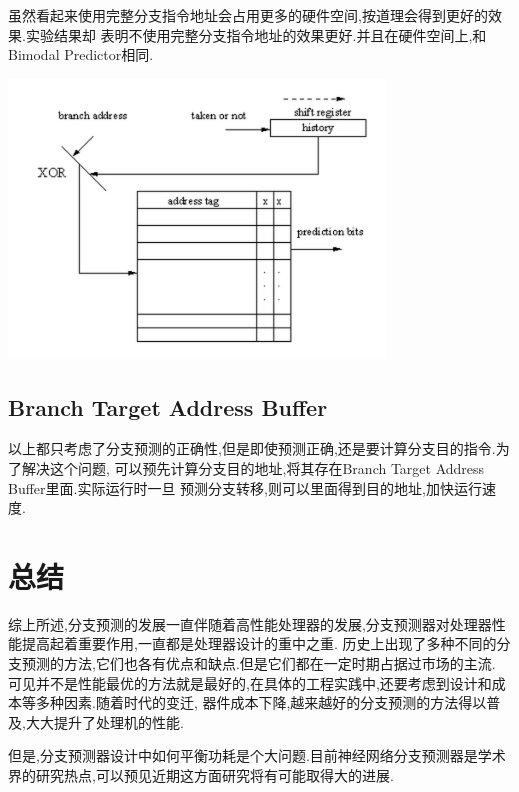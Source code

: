 \documentclass[adobefonts, nocap]{ctexart}
\begin{document}
      虽然看起来使用完整分支指令地址会占用更多的硬件空间,按道理会得到更好的效果.实验结果却
      表明不使用完整分支指令地址的效果更好.并且在硬件空间上,和Bimodal Predictor相同.

      \begin{center}
        \includegraphics[width=10cm]{10.png}
      \end{center}
    \subsection{Branch Target Address Buffer}
      以上都只考虑了分支预测的正确性,但是即使预测正确,还是要计算分支目的指令.为了解决这个问题,
      可以预先计算分支目的地址,将其存在Branch Target Address Buffer里面.实际运行时一旦
      预测分支转移,则可以里面得到目的地址,加快运行速度.
  \section{总结}
    综上所述,分支预测的发展一直伴随着高性能处理器的发展,分支预测器对处理器性能提高起着重要作用,一直都是处理器设计的重中之重.
    历史上出现了多种不同的分支预测的方法,它们也各有优点和缺点.但是它们都在一定时期占据过市场的主流.
    可见并不是性能最优的方法就是最好的,在具体的工程实践中,还要考虑到设计和成本等多种因素.随着时代的变迁,
    器件成本下降,越来越好的分支预测的方法得以普及,大大提升了处理机的性能.

    但是,分支预测器设计中如何平衡功耗是个大问题.目前神经网络分支预测器是学术界的研究热点,可以预见近期这方面研究将有可能取得大的进展.
\end{document}

